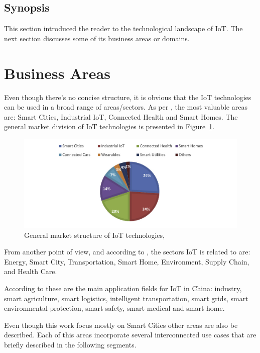 \subsection{Synopsis}
\label{subsec:stateofart:synopsis}

This section introduced the reader to the technological landscape of \gls{IoT}. The next section discusses some of its business areas or domains.

\section{Business Areas}
\label{sec:stateofart:areas}

Even though there's no concise structure, it is obvious that the \gls{IoT} technologies can be used in a broad range of areas/sectors. As per \cite{nivzetic2019smart}, the most valuable areas are: Smart Cities, Industrial \gls{IoT}, Connected Health and Smart Homes. The general market division of IoT technologies is presented in Figure~\ref{fig:iot-areas}.

\begin{figure}[H]
    \centering
    \includegraphics[scale=0.5]{assets/figures/iot-areas.png}
    \caption[IoT market structure]{General market structure of IoT technologies, \cite{nivzetic2019smart}}
    \label{fig:iot-areas}
\end{figure}

From another point of view, and according to \cite{7073822}, the sectors \gls{IoT} is related to are: Energy, Smart City, Transportation, Smart Home, Environment, Supply Chain, and Health Care.

According to \cite{6851114} these are the main application fields for \gls{IoT} in China: industry, smart agriculture, smart logistics, intelligent transportation, smart grids, smart environmental protection, smart safety, smart medical and smart home.

Even though this work focus mostly on Smart Cities other areas are also be described. Each of this areas incorporate several interconnected use cases that are briefly described in the following segments.

